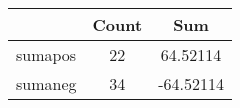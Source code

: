 {
\def\sym#1{\ifmmode^{#1}\else\(^{#1}\)\fi}
\begin{tabular}{l*{1}{cc}}
\hline\hline
          &    Count&      Sum\\
\hline
sumapos   &       22& 64.52114\\
sumaneg   &       34&-64.52114\\
\hline\hline
\end{tabular}
}
